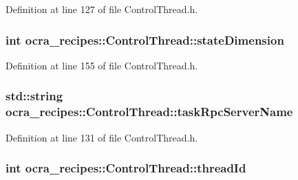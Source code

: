 Definition at line 127 of file Control\+Thread.\+h.

\subsubsection[{\texorpdfstring{state\+Dimension}{stateDimension}}]{\setlength{\rightskip}{0pt plus 5cm}int ocra\+\_\+recipes\+::\+Control\+Thread\+::state\+Dimension\hspace{0.3cm}{\ttfamily [protected]}}\hypertarget{classocra__recipes_1_1ControlThread_a1ab9aaa641766b8bf29812925701a52f}{}\label{classocra__recipes_1_1ControlThread_a1ab9aaa641766b8bf29812925701a52f}


Definition at line 155 of file Control\+Thread.\+h.

\subsubsection[{\texorpdfstring{task\+Rpc\+Server\+Name}{taskRpcServerName}}]{\setlength{\rightskip}{0pt plus 5cm}std\+::string ocra\+\_\+recipes\+::\+Control\+Thread\+::task\+Rpc\+Server\+Name\hspace{0.3cm}{\ttfamily [protected]}}\hypertarget{classocra__recipes_1_1ControlThread_abbc082e54db816a3298c3e5ae5d3f9ef}{}\label{classocra__recipes_1_1ControlThread_abbc082e54db816a3298c3e5ae5d3f9ef}


Definition at line 131 of file Control\+Thread.\+h.

\subsubsection[{\texorpdfstring{thread\+Id}{threadId}}]{\setlength{\rightskip}{0pt plus 5cm}int ocra\+\_\+recipes\+::\+Control\+Thread\+::thread\+Id}\hypertarget{classocra__recipes_1_1ControlThread_abbcc309053e54da8531c77bac2dd1656}{}\label{classocra__recipes_1_1ControlThread_abbcc309053e54da8531c77bac2dd1656}


